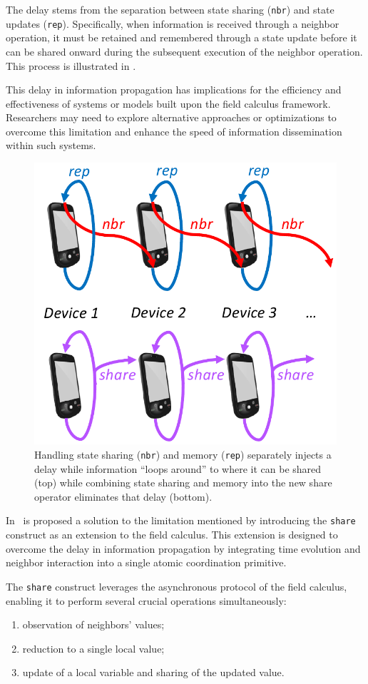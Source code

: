 The delay stems from the separation between state sharing (\texttt{nbr}) and state updates (\texttt{rep}). Specifically, when information is received through a neighbor operation, it must be retained and remembered through a state update before it can be shared onward during the subsequent execution of the neighbor operation. This process is illustrated in .

This delay in information propagation has implications for the efficiency and effectiveness of systems or models built upon the field calculus framework. Researchers may need to explore alternative approaches or optimizations to overcome this limitation and enhance the speed of information dissemination within such systems.

\begin{figure}[ht!]
    \centering
    \includegraphics[width=.5\linewidth]{figures/state-sharing.png}
    \caption{Handling state sharing (\texttt{nbr}) and memory (\texttt{rep}) separately injects a delay while information ``loops around'' to where it can be shared (top) while combining state sharing and memory into the new share operator eliminates that delay (bottom).}
    \label{fig:handling-state-sharing}
\end{figure}

In~\cite{Audrito2018} is proposed a solution to the limitation mentioned by introducing the \texttt{share} construct as an extension to the field calculus. This extension is designed to overcome the delay in information propagation by integrating time evolution and neighbor interaction into a single atomic coordination primitive.

The \texttt{share} construct leverages the asynchronous protocol of the field calculus, enabling it to perform several crucial operations simultaneously:

\begin{enumerate}
    \item observation of neighbors' values;
    \item reduction to a single local value;
    \item update of a local variable and sharing of the updated value.
\end{enumerate}


